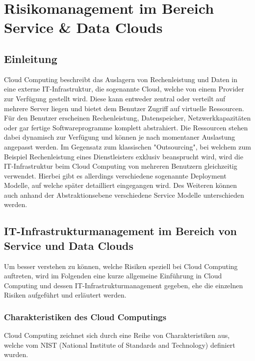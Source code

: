 \documentclass{report}
\begin{document}




\chapter{Risikomanagement im Bereich Service \& Data Clouds}

\section{Einleitung}
Cloud Computing beschreibt das Auslagern von Rechenleistung und Daten in eine externe IT-Infrastruktur, die sogenannte Cloud, welche von einem Provider zur Verfügung gestellt wird. Diese kann entweder zentral oder verteilt auf mehrere Server liegen und bietet dem Benutzer Zugriff auf virtuelle Ressourcen. Für den Benutzer erscheinen Rechenleistung, Datenspeicher, Netzwerkkapazitäten oder gar fertige Softwareprogramme komplett abstrahiert. Die Ressourcen stehen dabei dynamisch zur Verfügung und können je nach momentaner Auslastung angepasst werden. Im Gegensatz zum klassischen "Outsourcing", bei welchem zum Beispiel Rechenleistung eines Dienstleisters exklusiv beansprucht wird, wird die IT-Infrastruktur beim Cloud Computing von mehreren Benutzern gleichzeitig verwendet. Hierbei gibt es allerdings verschiedene sogenannte Deployment Modelle, auf welche später detailliert eingegangen wird. Des Weiteren können auch anhand der Abstraktionsebene verschiedene Service Modelle unterschieden werden. 

\section{IT-Infrastrukturmanagement im Bereich von Service und Data Clouds}
Um besser verstehen zu können, welche Risiken speziell bei Cloud Computing auftreten, wird im Folgenden eine kurze allgemeine Einführung in Cloud Computing und dessen IT-Infrastrukturmanagement gegeben, ehe die einzelnen Risiken aufgeführt und erläutert werden. \cite{koe2013} \cite{haa2013}

\subsection{Charakteristiken des Cloud Computings}
Cloud Computing zeichnet sich durch eine Reihe von Charakteristiken aus, welche vom NIST (National Institute of Standards and Technology) definiert wurden.
\end{document}
